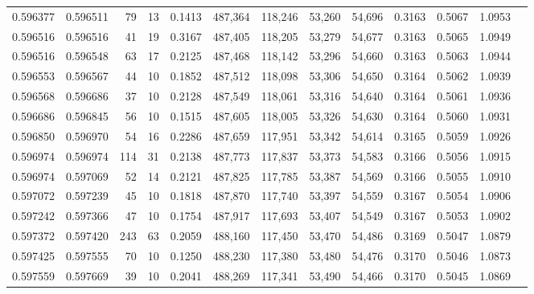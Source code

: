 \begin{tabular}{rrrrrrrrrrrrr}
0.596377 & 0.596511 &    79 &  13 &                                     0.1413 & 487,364 & 118,246 &  53,260 &  54,696 & 0.3163 & 0.5067 & 1.0953 \\
0.596516 & 0.596516 &    41 &  19 &                                     0.3167 & 487,405 & 118,205 &  53,279 &  54,677 & 0.3163 & 0.5065 & 1.0949 \\
0.596516 & 0.596548 &    63 &  17 &                                     0.2125 & 487,468 & 118,142 &  53,296 &  54,660 & 0.3163 & 0.5063 & 1.0944 \\
0.596553 & 0.596567 &    44 &  10 &                                     0.1852 & 487,512 & 118,098 &  53,306 &  54,650 & 0.3164 & 0.5062 & 1.0939 \\
0.596568 & 0.596686 &    37 &  10 &                                     0.2128 & 487,549 & 118,061 &  53,316 &  54,640 & 0.3164 & 0.5061 & 1.0936 \\
0.596686 & 0.596845 &    56 &  10 &                                     0.1515 & 487,605 & 118,005 &  53,326 &  54,630 & 0.3164 & 0.5060 & 1.0931 \\
0.596850 & 0.596970 &    54 &  16 &                                     0.2286 & 487,659 & 117,951 &  53,342 &  54,614 & 0.3165 & 0.5059 & 1.0926 \\
0.596974 & 0.596974 &   114 &  31 &                                     0.2138 & 487,773 & 117,837 &  53,373 &  54,583 & 0.3166 & 0.5056 & 1.0915 \\
0.596974 & 0.597069 &    52 &  14 &                                     0.2121 & 487,825 & 117,785 &  53,387 &  54,569 & 0.3166 & 0.5055 & 1.0910 \\
0.597072 & 0.597239 &    45 &  10 &                                     0.1818 & 487,870 & 117,740 &  53,397 &  54,559 & 0.3167 & 0.5054 & 1.0906 \\
0.597242 & 0.597366 &    47 &  10 &                                     0.1754 & 487,917 & 117,693 &  53,407 &  54,549 & 0.3167 & 0.5053 & 1.0902 \\
0.597372 & 0.597420 &   243 &  63 &                                     0.2059 & 488,160 & 117,450 &  53,470 &  54,486 & 0.3169 & 0.5047 & 1.0879 \\
0.597425 & 0.597555 &    70 &  10 &                                     0.1250 & 488,230 & 117,380 &  53,480 &  54,476 & 0.3170 & 0.5046 & 1.0873 \\
0.597559 & 0.597669 &    39 &  10 &                                     0.2041 & 488,269 & 117,341 &  53,490 &  54,466 & 0.3170 & 0.5045 & 1.0869 \\

\end{tabular}
